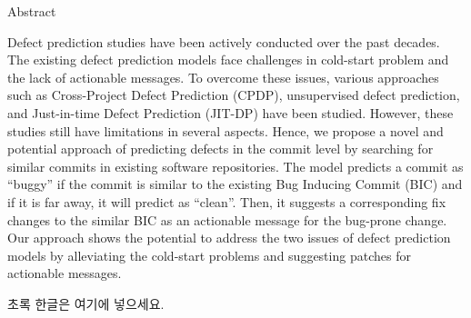 
\newcommand{\abstractEN}[1]{\normalsize #1 \par}
\newcommand{\abstractKR}[1]{\normalsize #1 \par}

\fontsize{14}{18} \selectfont Abstract \par
{}

\bigskip
\abstractEN{
    Defect prediction studies have been actively conducted over the past decades.
    The existing defect prediction models face challenges in cold-start problem and the lack of actionable messages.
    To overcome these issues, various approaches such as Cross-Project Defect Prediction (CPDP), unsupervised defect prediction, and Just-in-time Defect Prediction (JIT-DP) have been studied.
    However, these studies still have limitations in several aspects.
    Hence, we propose a novel and potential approach of predicting defects in the commit level by searching for similar commits in existing software repositories.
    The model predicts a commit as ``buggy'' if the commit is similar to the existing Bug Inducing Commit (BIC) and if it is far away, it will predict as ``clean''.
    Then, it suggests a corresponding fix changes to the similar BIC as an actionable message for the bug-prone change.
    Our approach shows the potential to address the two issues of defect prediction models by alleviating the cold-start problems and suggesting patches for actionable messages. 
}
\bigskip
\bigskip
\abstractKR{
초록 한글은 여기에 넣으세요. 
}

\clearpage
